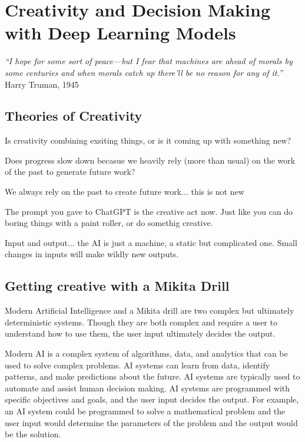 \setchapterpreamble[u]{\margintoc}
\chapter{Creativity and Decision Making with Deep Learning Models}

\textit{“I hope for some sort of peace—but I fear that machines are ahead of morals by some centuries and when morals catch up there'll be no reason for any of it.”} Harry Truman, 1945 \cite{McCullough1992}


\section{Theories of Creativity}

Is creativity combining exsiting things, or is it coming up with something new?

Does progress slow down becasue we heavily rely (more than usual) on the work of the past to generate future work?

We always rely on the past to create future work... this is not new

The prompt you gave to ChatGPT is the creative act now. Just like you can do boring things with a paint roller, or do somethig creative.

Input and output... the AI is just a machine, a static but complicated one. Small changes in inputs will make wildly new outputs.

\section{Getting creative with a Mikita Drill}

Modern Artificial Intelligence and a Mikita drill are two complex but ultimately deterministic systems. Though they are both complex and require a user to understand how to use them, the user input ultimately decides the output.

Modern AI is a complex system of algorithms, data, and analytics that can be used to solve complex problems. AI systems can learn from data, identify patterns, and make predictions about the future. AI systems are typically used to automate and assist human decision making. AI systems are programmed with specific objectives and goals, and the user input decides the output. For example, an AI system could be programmed to solve a mathematical problem and the user input would determine the parameters of the problem and the output would be the solution.

